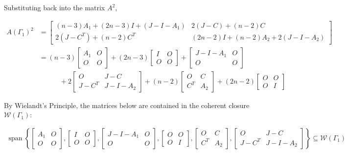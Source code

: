 Substituting back into the matrix $A^2$,

\begin{align*}
    A(\Gamma_1)^2 &= \begin{bmatrix}
        (n-3)A_1 + (2n-3)I + (J-I-A_1) & 2(J-C) + (n-2)C \\
        2(J-C^T) + (n-2)C^T & (2n-2)I + (n-2)A_2 + 2(J-I-A_2)
    \end{bmatrix} \\
    &= (n-3)\begin{bmatrix}
        A_1 & O\\
        O & O
    \end{bmatrix} + (2n-3)\begin{bmatrix}
        I & O\\O & O
    \end{bmatrix} + \begin{bmatrix}
        J-I-A_1 & O \\ O&O
    \end{bmatrix}\\
    &\quad\quad\quad+2\begin{bmatrix}
        O&J-C\\J-C^T&J-I-A_2
    \end{bmatrix} + (n-2)\begin{bmatrix}
        O&C\\C^T&A_2
    \end{bmatrix} + (2n-2)\begin{bmatrix}
        O&O\\O&I
    \end{bmatrix}
\end{align*}

By Wielandt's Principle, the matrices below are contained in the coherent closure $\mathcal{W}(\Gamma_1)$:

\begin{align*}
    \operatorname{span}\left\{\begin{bmatrix}
        A_1 & O\\
        O & O
    \end{bmatrix},
    \begin{bmatrix}
        I & O\\O & O
    \end{bmatrix},
    \begin{bmatrix}
        J-I-A_1 & O \\ O&O
    \end{bmatrix},
    \begin{bmatrix}
        O&O\\O&I
    \end{bmatrix},
    \begin{bmatrix}
        O&C\\C^T&A_2
    \end{bmatrix},
    \begin{bmatrix}
        O&J-C\\J-C^T&J-I-A_2
    \end{bmatrix}\right\} \subseteq \mathcal{W}(\Gamma_1)
\end{align*}

